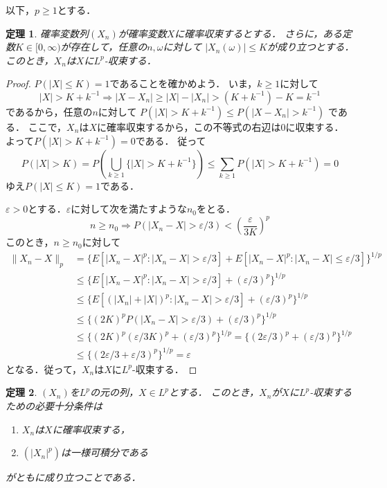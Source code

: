 \documentclass{jsarticle}
\newtheorem{thm}{定理}
\begin{document}
以下，$p\geq1$とする．

\begin{thm}\label{有界収束定理}
確率変数列$(X_n)$が確率変数$X$に確率収束するとする．
さらに，ある定数$K\in[0,\infty)$が存在して，任意の$n,\omega$に対して
$|X_n(\omega)|\leq K$が成り立つとする．
このとき，$X_n$は$X$に$L^p$-収束する．
\end{thm}

\begin{proof}
$P(|X|\leq K)=1$であることを確かめよう．
いま，$k\geq1$に対して
\[
|X|>K+k^{-1}
\Rightarrow|X-X_n|\geq|X|-|X_n|
>(K+k^{-1})-K=k^{-1}
\]
であるから，任意の$n$に対して
$P(|X|>K+k^{-1})\leq P(|X-X_n|>k^{-1})$
である．
ここで，$X_n$は$X$に確率収束するから，この不等式の右辺は0に収束する．
よって$P(|X|>K+k^{-1})=0$である．
従って
\[
P(|X|>K)=P\left(\bigcup_{k\geq1}\{|X|>K+k^{-1}\}\right)
\leq\sum_{k\geq1}P(|X|>K+k^{-1})=0
\]
ゆえ$P(|X|\leq K)=1$である．

$\varepsilon>0$とする．$\varepsilon$に対して次を満たすような$n_0$をとる．
\[
n\geq n_0\Rightarrow P(|X_n-X|>\varepsilon/3)<\left(\frac{\varepsilon}{3K}\right)^p
\]
このとき，$n\geq n_0$に対して
\begin{align*}
\|X_n-X\|_p
&=\{E[|X_n-X|^p:|X_n-X|>\varepsilon/3]+E[|X_n-X|^p:|X_n-X|\leq\varepsilon/3]\}^{1/p} \\
&\leq\{E[|X_n-X|^p:|X_n-X|>\varepsilon/3]+(\varepsilon/3)^p\}^{1/p} \\
&\leq\{E[(|X_n|+|X|)^p:|X_n-X|>\varepsilon/3]+(\varepsilon/3)^p\}^{1/p} \\
&\leq\{(2K)^pP(|X_n-X|>\varepsilon/3)+(\varepsilon/3)^p\}^{1/p} \\
&\leq\{(2K)^p(\varepsilon/3K)^p+(\varepsilon/3)^p\}^{1/p}
=\{(2\varepsilon/3)^p+(\varepsilon/3)^p\}^{1/p} \\
&\leq\{(2\varepsilon/3+\varepsilon/3)^p\}^{1/p}=\varepsilon
\end{align*}
となる．従って，$X_n$は$X$に$L^p$-収束する．
\end{proof}

\begin{thm}
$(X_n)$を$L^p$の元の列，$X\in L^p$とする．
このとき，$X_n$が$X$に$L^p$-収束するための必要十分条件は
\begin{enumerate}
\item$X_n$は$X$に確率収束する，
\item$(|X_n|^p)$は一様可積分である
\end{enumerate}
がともに成り立つことである．
\end{thm}
\end{document}
